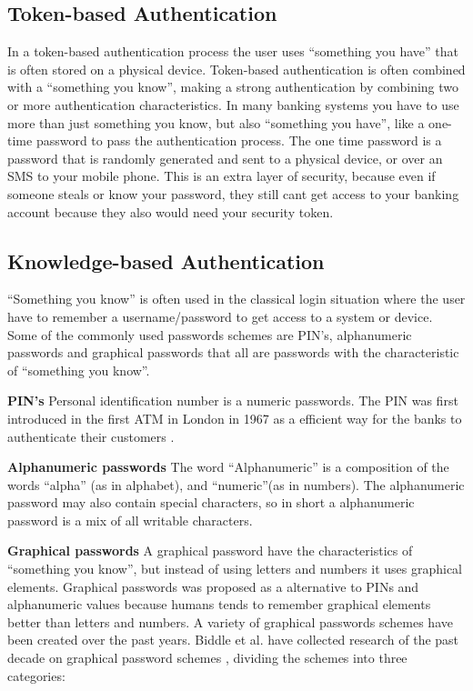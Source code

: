     \subsection{Token-based Authentication}
    In a token-based authentication process the user uses ``something you have'' that is often stored on a physical device. Token-based authentication is often combined with a ``something you know'', making a strong authentication by combining two or more authentication characteristics. In many banking systems you have to use more than just something you know, but also ``something you have'', like a one-time password to pass the authentication process. The one time password is a password that is randomly generated and sent to a physical device, or over an SMS to your mobile phone. This is an extra layer of security, because even if someone steals or know your password, they still cant get access to your banking account because they also would need your security token.


    \subsection{Knowledge-based Authentication}
    ``Something you know'' is often used in the classical login situation where the user have to remember a username/password to get access to a system or device. Some of the commonly used passwords schemes are PIN's, alphanumeric passwords and graphical passwords that all are passwords with the characteristic of ``something you know''.

      {\bf PIN's} Personal identification number is a numeric passwords. The PIN was first introduced in the first ATM in London in 1967 as a efficient way for the banks to authenticate their customers \cite{Bonneau1}.      

      {\bf Alphanumeric passwords}
      The word ``Alphanumeric'' is a composition of the words ``alpha'' (as in alphabet), and ``numeric''(as in numbers). The alphanumeric password may also contain special characters, so in short a alphanumeric password is a mix of all writable characters.

      {\bf Graphical passwords}
      A graphical password have the characteristics of ``something you know'', but instead of using letters and numbers it uses graphical elements. Graphical passwords was proposed as a alternative to PINs and alphanumeric values because humans tends to remember graphical elements better than letters and numbers. A variety of graphical passwords schemes have been created over the past years. Biddle et al. have collected research of the past decade on graphical password schemes \cite{Biddle}, dividing the schemes into three categories: 

